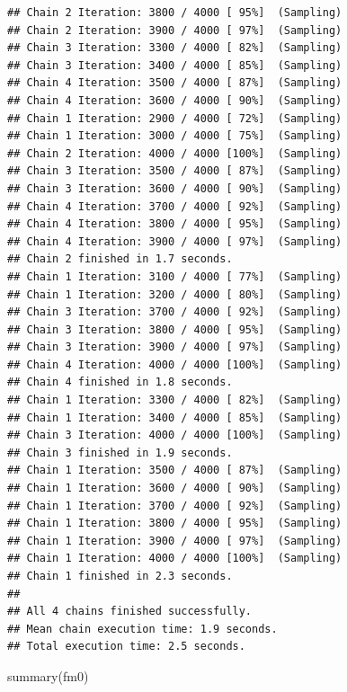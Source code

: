 \documentclass[
]{article}
\newenvironment{Shaded}{\begin{snugshade}}{\end{snugshade}}
\newcommand{\FunctionTok}[1]{\textcolor[rgb]{0.00,0.00,0.00}{#1}}
\newcommand{\NormalTok}[1]{#1}
\begin{document}
\begin{verbatim}
## Chain 2 Iteration: 3800 / 4000 [ 95%]  (Sampling) 
## Chain 2 Iteration: 3900 / 4000 [ 97%]  (Sampling) 
## Chain 3 Iteration: 3300 / 4000 [ 82%]  (Sampling) 
## Chain 3 Iteration: 3400 / 4000 [ 85%]  (Sampling) 
## Chain 4 Iteration: 3500 / 4000 [ 87%]  (Sampling) 
## Chain 4 Iteration: 3600 / 4000 [ 90%]  (Sampling) 
## Chain 1 Iteration: 2900 / 4000 [ 72%]  (Sampling) 
## Chain 1 Iteration: 3000 / 4000 [ 75%]  (Sampling) 
## Chain 2 Iteration: 4000 / 4000 [100%]  (Sampling) 
## Chain 3 Iteration: 3500 / 4000 [ 87%]  (Sampling) 
## Chain 3 Iteration: 3600 / 4000 [ 90%]  (Sampling) 
## Chain 4 Iteration: 3700 / 4000 [ 92%]  (Sampling) 
## Chain 4 Iteration: 3800 / 4000 [ 95%]  (Sampling) 
## Chain 4 Iteration: 3900 / 4000 [ 97%]  (Sampling) 
## Chain 2 finished in 1.7 seconds.
## Chain 1 Iteration: 3100 / 4000 [ 77%]  (Sampling) 
## Chain 1 Iteration: 3200 / 4000 [ 80%]  (Sampling) 
## Chain 3 Iteration: 3700 / 4000 [ 92%]  (Sampling) 
## Chain 3 Iteration: 3800 / 4000 [ 95%]  (Sampling) 
## Chain 3 Iteration: 3900 / 4000 [ 97%]  (Sampling) 
## Chain 4 Iteration: 4000 / 4000 [100%]  (Sampling) 
## Chain 4 finished in 1.8 seconds.
## Chain 1 Iteration: 3300 / 4000 [ 82%]  (Sampling) 
## Chain 1 Iteration: 3400 / 4000 [ 85%]  (Sampling) 
## Chain 3 Iteration: 4000 / 4000 [100%]  (Sampling) 
## Chain 3 finished in 1.9 seconds.
## Chain 1 Iteration: 3500 / 4000 [ 87%]  (Sampling) 
## Chain 1 Iteration: 3600 / 4000 [ 90%]  (Sampling) 
## Chain 1 Iteration: 3700 / 4000 [ 92%]  (Sampling) 
## Chain 1 Iteration: 3800 / 4000 [ 95%]  (Sampling) 
## Chain 1 Iteration: 3900 / 4000 [ 97%]  (Sampling) 
## Chain 1 Iteration: 4000 / 4000 [100%]  (Sampling) 
## Chain 1 finished in 2.3 seconds.
## 
## All 4 chains finished successfully.
## Mean chain execution time: 1.9 seconds.
## Total execution time: 2.5 seconds.
\end{verbatim}

\begin{Shaded}
\begin{Highlighting}[]
\FunctionTok{summary}\NormalTok{(fm0)}
\end{Highlighting}
\end{Shaded}
\end{document}
